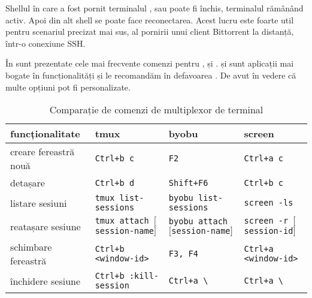 Shellul în care a fost pornit terminalul ,  sau  poate fi închis, terminalul rămânând activ.
Apoi din alt shell se poate face reconectarea.
Acest lucru este foarte util pentru scenariul precizat mai sus, al pornirii unui client Bittorrent la distanță, într-o conexiune SSH.

În  sunt prezentate cele mai frecvente comenzi pentru ,  și .
 și  sunt aplicații mai bogate în funcționalități și le recomandăm în defavoarea .
De avut în vedere că multe opțiuni pot fi personalizate.

\begin{table}[!htb]
  \scriptsize
  \begin{center}
    \begin{tabular}{ p{} p{} p{} p{} }
      \toprule
        \textbf{funcționalitate} &
        \textbf{tmux} &
        \textbf{byobu} &
        \textbf{screen} \\
      \midrule
        creare fereastră nouă &
        \texttt{Ctrl+b c} &
        \texttt{F2} &
        \texttt{Ctrl+a c} \\
      \midrule
        detașare &
        \texttt{Ctrl+b d} &
        \texttt{Shift+F6} &
        \texttt{Ctrl+b c} \\
      \midrule
        listare sesiuni &
        \texttt{tmux list-sessions} &
        \texttt{byobu list-sessions} &
        \texttt{screen -ls} \\
      \midrule
        reatașare sesiune &
        \texttt{tmux attach $[$session-name$]$} &
        \texttt{byobu attach $[$session-name$]$} &
        \texttt{screen -r $[$session-id$]$} \\
      \midrule
        schimbare fereastră &
        \texttt{Ctrl+b \textless{}window-id>} &
        \texttt{F3, F4} &
        \texttt{Ctrl+a \textless{}window-id>} \\
      \midrule
        închidere sesiune &
        \texttt{Ctrl+b :kill-session} &
        \texttt{Ctrl+a \textbackslash{}} &
        \texttt{Ctrl+a \textbackslash{}} \\
      \bottomrule
    \end{tabular}
  \end{center}
  \caption{Comparație de comenzi de multiplexor de terminal}
  \label{tab:process:tmux-screen-byobu}
\end{table}

